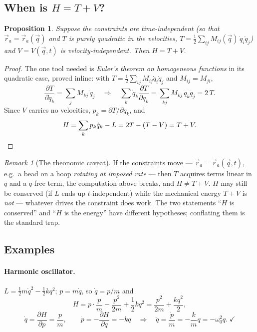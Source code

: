 \documentclass[11pt]{article}
\theoremstyle{plain}
\newtheorem{proposition}[theorem]{Proposition}
\theoremstyle{definition}
\theoremstyle{remark}
\newtheorem{remark}[theorem]{Remark}
\newcommand{\pd}[2]{\frac{\partial #1}{\partial #2}}
\newcommand{\vq}{\vec{q}}
\newcommand{\vr}{\vec{r}}
\begin{document}
\subsection{When is $H = T + V$?}
\label{sec:when-H-is-E}

\begin{proposition}\label{prop:H-is-E}
Suppose the constraints are time-independent (so that
$\vr_a = \vr_a(\vq)$ and $T$ is purely quadratic in the velocities,
$T = \tfrac12\sum_{ij} M_{ij}(\vq)\,\dot q_i\dot q_j$) and $V = V(\vq, t)$
is velocity-independent. Then $H = T + V$.
\end{proposition}
\begin{proof}
The one tool needed is \emph{Euler's theorem on homogeneous functions} in
its quadratic case, proved inline: with
$T = \tfrac12\sum_{ij}M_{ij}\dot q_i\dot q_j$ and $M_{ij}=M_{ji}$,
\begin{equation}
  \pd{T}{\dot q_k} = \sum_j M_{kj}\,\dot q_j
  \quad\Longrightarrow\quad
  \sum_k \dot q_k \pd{T}{\dot q_k}
  = \sum_{kj} M_{kj}\,\dot q_k\dot q_j = 2\,T .
\end{equation}
Since $V$ carries no velocities, $p_k = \partial T/\partial\dot q_k$, and
\begin{equation}
  H = \sum_k p_k\dot q_k - L = 2T - (T - V) = T + V . \qedhere
\end{equation}
\end{proof}

\begin{remark}[The rheonomic caveat]
If the constraints move --- $\vr_a = \vr_a(\vq, t)$, e.g.\ a bead on a
hoop \emph{rotating at imposed rate} --- then $T$ acquires terms linear in
$\dot q$ and a $\dot q$-free term, the computation above breaks, and
$H \ne T + V$. $H$ may still be conserved (if $L$ ends up
$t$-independent) while the mechanical energy $T + V$ is \emph{not} ---
whatever drives the constraint does work. The two statements ``$H$ is
conserved'' and ``$H$ is the energy'' have different hypotheses; conflating
them is the standard trap.
\end{remark}

\subsection{Examples}

\paragraph{Harmonic oscillator.}
$L = \tfrac12 m\dot q^2 - \tfrac12 kq^2$; $p = m\dot q$, so
$\dot q = p/m$ and
\begin{equation}
  H = p\cdot\frac{p}{m} - \frac{p^2}{2m} + \frac12 kq^2
  = \frac{p^2}{2m} + \frac{k q^2}{2},
\end{equation}
\begin{equation}
  \dot q = \pd Hp = \frac pm,
  \qquad
  \dot p = -\pd Hq = -kq
  \quad\Longrightarrow\quad
  \ddot q = \frac{\dot p}{m} = -\frac km q = -\omega_0^2 q .
  \;\checkmark
\end{equation}
\end{document}
